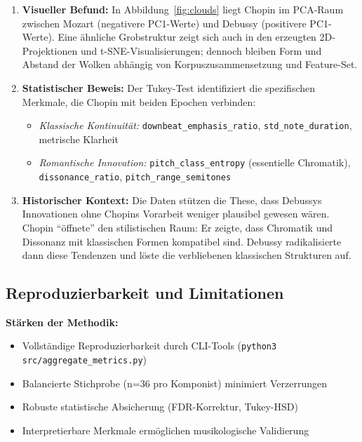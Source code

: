 \documentclass[12pt,a4paper]{article}
\theoremstyle{definition}
\begin{document}
\begin{enumerate}
    \item \textbf{Visueller Befund:} In Abbildung~\ref{fig:clouds} liegt Chopin im PCA-Raum zwischen Mozart (negativere PC1-Werte) und Debussy (positivere PC1-Werte). Eine ähnliche Grobstruktur zeigt sich auch in den erzeugten 2D-Projektionen und t-SNE-Visualisierungen; dennoch bleiben Form und Abstand der Wolken abhängig von Korpuszusammensetzung und Feature-Set.
    
    \item \textbf{Statistischer Beweis:} Der Tukey-Test identifiziert die spezifischen Merkmale, die Chopin mit beiden Epochen verbinden:
    \begin{itemize}
        \item \emph{Klassische Kontinuität:} \texttt{downbeat\_emphasis\_ratio}, \texttt{std\_note\_duration}, metrische Klarheit
        \item \emph{Romantische Innovation:} \texttt{pitch\_class\_entropy} (essentielle Chromatik), \texttt{dissonance\_ratio}, \texttt{pitch\_range\_semitones}
    \end{itemize}
    
    \item \textbf{Historischer Kontext:} Die Daten stützen die These, dass Debussys Innovationen ohne Chopins Vorarbeit weniger plausibel gewesen wären. Chopin \enquote{öffnete} den stilistischen Raum: Er zeigte, dass Chromatik und Dissonanz mit klassischen Formen kompatibel sind. Debussy radikalisierte dann diese Tendenzen und löste die verbliebenen klassischen Strukturen auf.
\end{enumerate}

\subsection{Reproduzierbarkeit und Limitationen}
\textbf{Stärken der Methodik:}
\begin{itemize}
    \item Vollständige Reproduzierbarkeit durch CLI-Tools (\texttt{python3 src/aggregate\_metrics.py})
    \item Balancierte Stichprobe (n=36 pro Komponist) minimiert Verzerrungen
    \item Robuste statistische Absicherung (FDR-Korrektur, Tukey-HSD)
    \item Interpretierbare Merkmale ermöglichen musikologische Validierung
\end{itemize}
\end{document}
